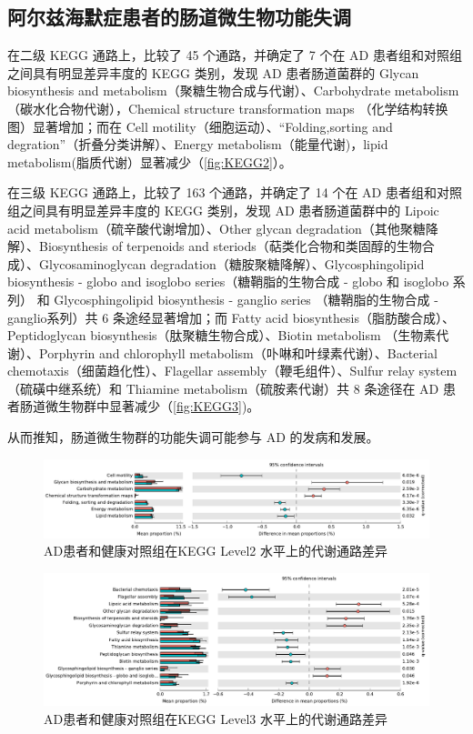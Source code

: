 \documentclass[supercite]{HustGraduPaper}
\begin{document}
\subsection{阿尔兹海默症患者的肠道微生物功能失调}
在二级 KEGG 通路上，比较了 45 个通路，并确定了 7 个在 AD 患者组和对照组之间具有明显差异丰度的 KEGG 类别，发现 AD 患者肠道菌群的 Glycan biosynthesis and metabolism（聚糖生物合成与代谢）、Carbohydrate metabolism（碳水化合物代谢），Chemical structure transformation maps （化学结构转换图）显著增加；而在 Cell motility（细胞运动）、“Folding,sorting and degration”（折叠分类讲解）、Energy metabolism（能量代谢)，lipid metabolism(脂质代谢）显著减少（\autoref{fig:KEGG2}）。

在三级 KEGG 通路上，比较了 163 个通路，并确定了 14 个在 AD 患者组和对照组之间具有明显差异丰度的 KEGG 类别，发现 AD 患者肠道菌群中的 Lipoic acid metabolism（硫辛酸代谢增加）、Other glycan degradation（其他聚糖降解）、Biosynthesis of terpenoids and steriods（萜类化合物和类固醇的生物合成）、Glycosaminoglycan degradation（糖胺聚糖降解）、Glycosphingolipid biosynthesis - globo and isoglobo series（糖鞘脂的生物合成 - globo 和 isoglobo 系列） 和 Glycosphingolipid biosynthesis - ganglio series （糖鞘脂的生物合成 - ganglio系列）共 6 条途经显著增加；而 Fatty acid biosynthesis（脂肪酸合成）、Peptidoglycan biosynthesis（肽聚糖生物合成）、Biotin metabolism （生物素代谢）、Porphyrin and chlorophyll metabolism（卟啉和叶绿素代谢）、Bacterial chemotaxis（细菌趋化性）、Flagellar assembly（鞭毛组件）、Sulfur relay system（硫磺中继系统）和 Thiamine metabolism（硫胺素代谢）共 8 条途径在 AD 患者肠道微生物群中显著减少（\autoref{fig:KEGG3})。

从而推知，肠道微生物群的功能失调可能参与 AD 的发病和发展。
\begin{figure}[htb]
	\includegraphics[width=\textwidth]{plot/KEGG2.pdf}
	\caption{AD患者和健康对照组在KEGG Level2 水平上的代谢通路差异}
	\label{fig:KEGG2}
\end{figure}
\begin{figure}[htb]
	\includegraphics[width=\textwidth]{plot/KEGG3.pdf}
	\caption{AD患者和健康对照组在KEGG Level3 水平上的代谢通路差异}
	\label{fig:KEGG3}
\end{figure}
\end{document}
